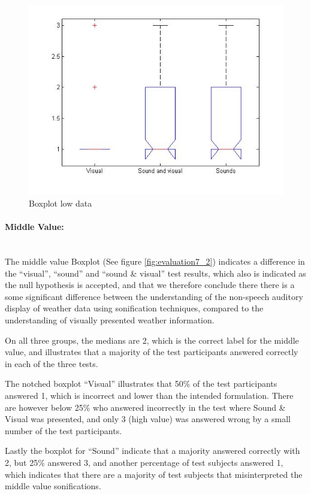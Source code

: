 \begin{figure}[!htbp]
    \centering
    \includegraphics[width=.5\textwidth]{images/Evaluation3.jpg}
    \caption{Boxplot low data}
    \label{fig:evaluation3_2}
\end{figure}


\paragraph{Middle Value:} %
\label{par:middle_value_}
\hspace{0pt} \\
The middle value Boxplot (See figure \ref{fig:evaluation7_2}) indicates a difference in the \enquote{visual}, \enquote{sound} and \enquote{sound \& visual} test results, which also is indicated as the null hypothesis is accepted, and that we therefore conclude there there is a some significant difference between the understanding of the non-speech auditory display of weather data using sonification techniques, compared to the understanding of visually presented weather information.

On all three groups, the medians are 2, which is the correct label for the middle value, and illustrates that a majority of the test participants answered correctly in each of the three tests.

The notched boxplot \enquote{Visual} illustrates that 50\% of the test participants answered 1, which is incorrect and lower than the intended formulation. 
There are however below 25\% who answered incorrectly in the test where Sound \& Visual was presented, and only 3 (high value) was answered wrong by a small number of the test participants.

Lastly the boxplot for \enquote{Sound} indicate that a majority answered correctly with 2, but 25\% answered 3, and another percentage of test subjects answered 1, which indicates that there are a majority of test subjects that misinterpreted the middle value sonifications. 

